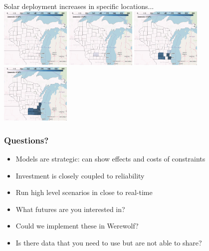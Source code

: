 \documentclass[xcolor=dvipsnames]{beamer}
\begin{document}
\begin{frame}
  Solar deployment increases in specific locations... \\
  \includegraphics[width=0.25\textwidth]{includes/no_leakage_maxNR_solar_r0.png}
  \includegraphics[width=0.25\textwidth]{includes/no_leakage_maxNR_solar_r2.png}
  \includegraphics[width=0.25\textwidth]{includes/no_leakage_maxNR_solar_r3.png}
  \includegraphics[width=0.25\textwidth]{includes/no_leakage_maxNR_solar_r4.png}

\end{frame}

\begin{frame}
  \frametitle{Questions?}
  \begin{itemize}
  \item Models are strategic: can show effects and costs of constraints
  \item Investment is closely coupled to reliability
  \item Run high level scenarios in close to real-time
  \item \alert{What futures are you interested in?}
    \color{blue}
  \item Could we implement these
    in Werewolf?
  \item Is there data that you need to use but are not able to share?
  \end{itemize}
\end{frame}
%
\appendix
\end{document}
